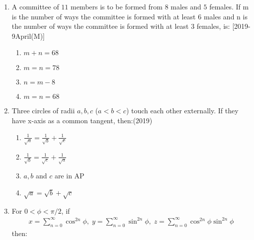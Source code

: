 \begin{enumerate}[label=\thesubsection.\arabic*,ref=\thesubsection.\theenumi]
\begin{multicols}{4}
\begin{enumerate}    
    \item $500$  
    \item $200$
    \item $300$
    \item $350$
    \end{enumerate}
\end{multicols}
%
	\item A committee of $11$ members is to be formed from $8$ males and $5$ females. If m is the number of ways the committee is formed with at least $6$ males and n is the number of ways the committee is formed with at least $3$ females,  is:
		\hfill{[2019-9April(M)]}
\begin{multicols}{4}
\begin{enumerate}    
      \item $m+n=68$ 
      \item $m=n=78$
      \item $n=m-8$
      \item $m=n=68$
  \end{enumerate}
\end{multicols}  
\item Three circles of radii $a,  b,  c$ ($a<b<c$) touch each other externally. If they have x-axis as a common tangent,  then:\hfill{(2019)}\begin{multicols}{4}
\begin{enumerate}     \itemsep.5em	
%  
  \item {$\frac{1}{\sqrt{a}}=\frac{1}{\sqrt{b}}+\frac{1}{\sqrt{c}}$} 
  \item {$\frac{1}{\sqrt{b}}=\frac{1}{\sqrt{c}}+\frac{1}{\sqrt{a}}$} 
  \item$a, b$ and $c$ are in AP
  \item{${\sqrt{a}}={\sqrt{b}}+{\sqrt{c}}$}
  \end{enumerate}
\end{multicols} 
\item For $0 < \phi < \pi /2$,  if 
\begin{align*}
x=\sum_{n=0}^{\infty} \cos^{2n} \phi ,  \; 
y=\sum_{n=0}^{\infty} \sin^{2n} \phi ,  \; 
z=\sum_{n=0}^{\infty} \cos^{2n} \phi \sin^{2n} \phi
\end{align*}
then: \hfill{}
\begin{multicols}{4}
\begin{multicols}{4}
\begin{enumerate}    

\end{enumerate}
\end{multicols}
\end{multicols}
\end{enumerate}
